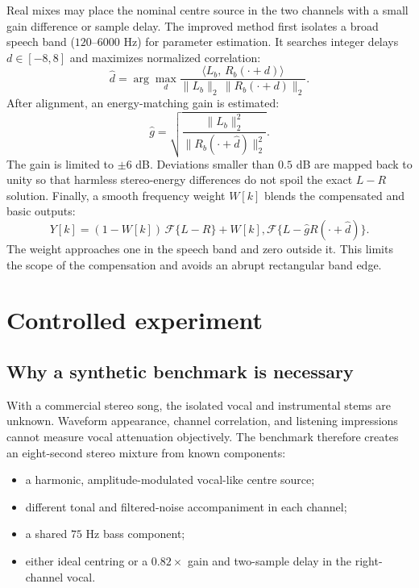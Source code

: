 \documentclass[11pt,a4paper]{article}
\begin{document}
Real mixes may place the nominal centre source in the two channels with a small
gain difference or sample delay. The improved method first isolates a broad
speech band ($120$--$6000$ Hz) for parameter estimation. It searches integer
delays $d\in[-8,8]$ and maximizes normalized correlation:
\begin{equation}
  \hat d=\arg\max_d
  \frac{\langle L_b,\,R_b(\cdot+d)\rangle}
  {\|L_b\|_2\,\|R_b(\cdot+d)\|_2}.
\end{equation}
After alignment, an energy-matching gain is estimated:
\begin{equation}
  \hat g=\sqrt{\frac{\|L_b\|_2^2}{\|R_b(\cdot+\hat d)\|_2^2}}.
\end{equation}
The gain is limited to $\pm6$ dB. Deviations smaller than $0.5$ dB are mapped
back to unity so that harmless stereo-energy differences do not spoil the exact
$L-R$ solution. Finally, a smooth frequency weight $W[k]$ blends the compensated
and basic outputs:
\begin{equation}
  Y[k]=(1-W[k])\,\mathcal{F}\{L-R\}
  +W[k],\mathcal{F}\{L-\hat gR(\cdot+\hat d)\}.
\end{equation}
The weight approaches one in the speech band and zero outside it. This limits
the scope of the compensation and avoids an abrupt rectangular band edge.

\section{Controlled experiment}

\subsection{Why a synthetic benchmark is necessary}

With a commercial stereo song, the isolated vocal and instrumental stems are
unknown. Waveform appearance, channel correlation, and listening impressions
cannot measure vocal attenuation objectively. The benchmark therefore creates
an eight-second stereo mixture from known components:
\begin{itemize}
  \item a harmonic, amplitude-modulated vocal-like centre source;
  \item different tonal and filtered-noise accompaniment in each channel;
  \item a shared $75$ Hz bass component;
  \item either ideal centring or a $0.82\times$ gain and two-sample delay in the
  right-channel vocal.
\end{itemize}
\end{document}
